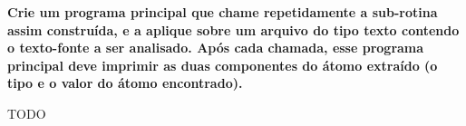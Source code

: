 
\textbf{Crie um programa principal que chame repetidamente a sub-rotina assim construída, e a aplique sobre um arquivo do tipo texto contendo o texto-fonte a ser analisado. Após cada chamada, esse programa principal deve imprimir as duas componentes do átomo extraído (o tipo e o valor do átomo encontrado).}

TODO
